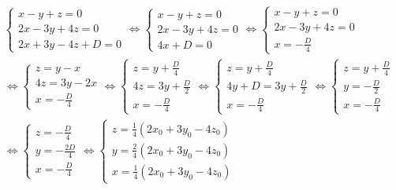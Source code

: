 \begin{align*}
  &\begin{cases}
    x - y + z = 0 \\
    2x - 3y + 4z = 0 \\
    2x + 3y - 4z + D = 0
  \end{cases} \iff
  \begin{cases}
      x - y + z = 0\\
      2x - 3y + 4z = 0\\
      4x + D = 0
  \end{cases} \iff
  \begin{cases}
      x - y + z = 0\\
      2x - 3y + 4z = 0\\
      x = -\frac{D}{4}
  \end{cases} \\
  &\iff
  \begin{cases}
      z = y - x \\
      4z = 3y - 2x \\
      x = -\frac{D}{4}
  \end{cases} \iff
  \begin{cases}
      z = y +\frac{D}{4} \\
      4z = 3y + \frac{D}{2} \\
      x = -\frac{D}{4}
  \end{cases} \iff
  \begin{cases}
      z = y +\frac{D}{4}\\
      4y + D = 3y + \frac{D}{2}\\
      x = -\frac{D}{4}
  \end{cases} \iff
  \begin{cases}
      z = y +\frac{D}{4}\\
      y = -\frac{D}{2}\\
      x = -\frac{D}{4}
  \end{cases} \\
  & \iff
  \begin{cases}
      z = -\frac{D}{4} \\
      y = -\frac{2D}{4} \\
      x = -\frac{D}{4}
  \end{cases} \iff
  \begin{cases}
      z = \frac{1}{4}(2x_0+3y_0-4z_0) \\
      y = \frac{2}{4}(2x_0+3y_0-4z_0) \\
      x = \frac{1}{4}(2x_0+3y_0-4z_0)
  \end{cases}
\end{align*}

